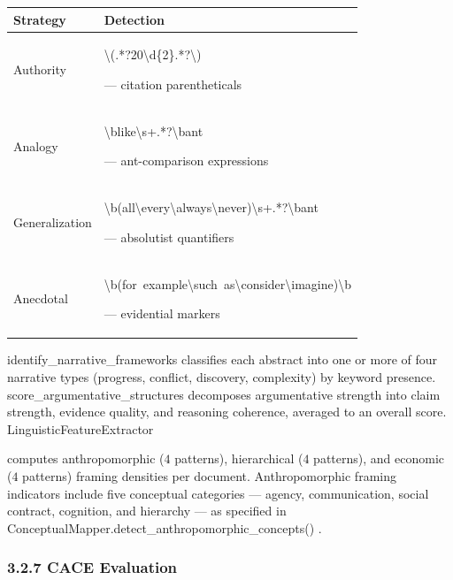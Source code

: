 \documentclass[
]{article}
\newcounter{none} %
\numberwithin{equation}{section}
\renewcommand{\texttt}[1]{%
    \colorbox{codebg}{\color{codefg}\ttfamily #1}%
}
\begin{document}
{\def\LTcaptype{none} %
\begin{longtable}[]{@{}
  >{\raggedright\arraybackslash}p{}
  >{\raggedright\arraybackslash}p{}@{}}
\toprule\noalign{}
\begin{minipage}[b]{\linewidth}\raggedright
Strategy
\end{minipage} & \begin{minipage}[b]{\linewidth}\raggedright
Detection
\end{minipage} \\
\midrule\noalign{}
\endhead
\bottomrule\noalign{}
\endlastfoot
Authority &
\texttt{\textbackslash{}(.*?20\textbackslash{}d\{2\}.*?\textbackslash{})}
--- citation parentheticals \\
Analogy &
\texttt{\textbackslash{}blike\textbackslash{}s+.*?\textbackslash{}bant}
--- ant-comparison expressions \\
Generalization &
\texttt{\textbackslash{}b(all\textbackslash{}\textbar{}every\textbackslash{}\textbar{}always\textbackslash{}\textbar{}never)\textbackslash{}s+.*?\textbackslash{}bant}
--- absolutist quantifiers \\
Anecdotal &
\texttt{\textbackslash{}b(for\ example\textbackslash{}\textbar{}such\ as\textbackslash{}\textbar{}consider\textbackslash{}\textbar{}imagine)\textbackslash{}b}
--- evidential markers \\
\end{longtable}
}

\texttt{identify\_narrative\_frameworks} classifies each abstract into
one or more of four narrative types (progress, conflict, discovery,
complexity) by keyword presence.
\texttt{score\_argumentative\_structures} decomposes argumentative
strength into claim strength, evidence quality, and reasoning coherence,
averaged to an overall score. \texttt{LinguisticFeatureExtractor}
computes anthropomorphic (\(4\) patterns), hierarchical (\(4\)
patterns), and economic (\(4\) patterns) framing densities per document.
Anthropomorphic framing indicators include five conceptual categories
--- agency, communication, social contract, cognition, and hierarchy ---
as specified in
\texttt{ConceptualMapper.detect\_anthropomorphic\_concepts()}.

\subsubsection{3.2.7 CACE Evaluation}\label{cace-evaluation}
\end{document}
